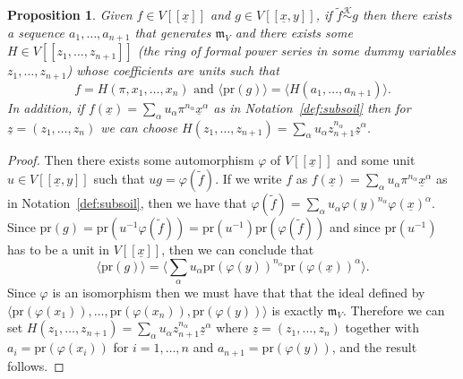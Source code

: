 \documentclass{article}
\newtheorem{proposition}[theorem]{Proposition}
\newcommand{\equivk}{\overset{\mathcal{K}}{\sim}}
\newcommand{\maxV}{\mathfrak{m}_V}
\newcommand{\Vx}{V[[\underline{x}]]}
\newcommand{\Vxy}{V[[\underline{x},y]]}
\numberwithin{theorem}{section}
\begin{document}
\begin{proposition}\label{prop:equivalence_easy}
    Given $f \in \Vx$ and $g \in \Vxy$, if $\tilde{f} \equivk g$ then there exists a sequence $a_1, \dots, a_{n+1}$ that generates $\maxV$ and there exists some $H \in V[[z_1, \dots, z_{n+1}]]$ (the ring of formal power series in  some dummy variables $z_1, \dots, z_{n+1}$) whose coefficients are units such that
    \begin{equation*}
         f =  H\left(\pi, x_1, \dots, x_n\right)  \text{ and } \langle \text{pr}(g) \rangle= \langle H\left(a_1, \dots, a_{n+1}\right) \rangle.
    \end{equation*}
    In addition, if $f\left(\underline{x}\right)=\sum_{\alpha} u_{ \alpha} \pi^{n_{\alpha}} \underline{x}^{\alpha}$ as in Notation~\ref{def:subsoil} then for $\underline{z}=(z_1, \dots, z_n)$ we can choose $H\left(z_1, \dots, z_{n+1}\right)=\sum_{\alpha} u_{ \alpha} z_{n+1}^{n_{\alpha}} \underline{z}^{\alpha}$.
\end{proposition}

\begin{proof}
     Then there exists some automorphism $\varphi$ of $\Vx$ and some unit $u \in \Vxy$ such that $ug=\varphi(\tilde{f})$. If we write $f$ as $f\left(\underline{x}\right)=\sum_{\alpha} u_{ \alpha} \pi^{n_{\alpha}} \underline{x}^{\alpha}$ as in Notation~\ref{def:subsoil}, then we have that  $\varphi(\tilde{f}) =\sum_{\alpha} u_{\alpha} \varphi\left(y\right)^{n_{\alpha}}\varphi\left(\underline{x}\right)^{\alpha}$. Since $\text{pr}(g) = \text{pr}\left(u^{-1}\varphi(\tilde{f})\right)=\text{pr}(u^{-1})\text{pr}\left(\varphi(\tilde{f})\right)$ and since $\text{pr}\left(u^{-1}\right)$ has to be a unit in $\Vx$, then we can conclude that 
    \begin{equation*}
        \langle \text{pr}(g) \rangle = \langle \sum_{\alpha} u_{\alpha} \text{pr}\left(\varphi\left(y\right)\right)^{n_\alpha} \text{pr}\left(\varphi\left(\underline{x}\right)\right)^{\alpha} \rangle.
    \end{equation*}
     Since $\varphi$ is an isomorphism then we must have that that the ideal defined by $\langle \text{pr}\left(\varphi\left(x_1\right) \right), \dots, \text{pr}\left(\varphi\left(x_n\right)\right), \text{pr}\left(\varphi\left(y\right)\right) \rangle$ is exactly $\maxV$.
    Therefore we can set $H\left(z_1, \dots, z_{n+1}\right)=\sum_{\alpha} u_{ \alpha} z_{n+1}^{n_{\alpha}} \underline{z}^{\alpha}$ where $\underline{z}=\left(z_1, \dots, z_n\right)$ together with $a_i=\text{pr}(\varphi(x_i))$ for $i=1,\dots, n$ and $a_{n+1}=\text{pr}(\varphi(y))$, and the result follows. 
\end{proof}
\end{document}
